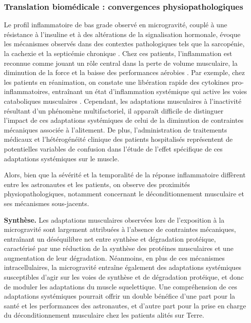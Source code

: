 \documentclass[11pt]{report}
\begin{document}
\subsubsection{Translation biomédicale : convergences physiopathologiques}

Le profil inflammatoire de bas grade observé en microgravité, couplé à une résistance à l'insuline et à des altérations de la signalisation hormonale, évoque les mécanismes observés dans des contextes pathologiques tels que la sarcopénie, la cachexie et la septicémie chronique \parencite{mehdi_endocrine_2025}. Chez ces patients, l'inflammation est reconnue comme jouant un rôle central dans la perte de volume musculaire, la diminution de la force et la baisse des performances aérobies \parencite{Damanti2024Oct}. Par exemple, chez les patients en réanimation, on constate une libération rapide des cytokines pro-inflammatoires, entraînant un état d'inflammation systémique qui active les voies cataboliques musculaires \parencite{mehdi_endocrine_2025,Damanti2024Oct}. Cependant, les adaptations musculaires à l'inactivité résultant d'un phénomène multifactoriel, il apparaît difficile de distinguer l'impact de ces adaptations systémiques de celui de la diminution de contraintes mécaniques associée à l'alitement. De plus, l'administration de traitements médicaux et l'hétérogénéité clinique des patients hospitalisés représentent de potentielles variables de confusion dans l'étude de l'effet spécifique de ces adaptations systémiques sur le muscle. 

Alors, bien que la sévérité et la temporalité de la réponse inflammatoire diffèrent entre les astronautes et les patients, on observe des proximités physiopathologiques, notamment concernant le déconditionnement musculaire et ses mécanismes sous-jacents.

\begin{tcolorbox}[colback=gray!3,colframe=gray!50, width=\textwidth]
	\textbf{Synthèse.} Les adaptations musculaires observées lors de l'exposition à la microgravité sont largement attribuées à l'absence de contraintes mécaniques, entraînant un déséquilibre net entre synthèse et dégradation protéique, caractérisé par une réduction de la synthèse des protéines musculaires et une augmentation de leur dégradation. Néanmoins, en plus de ces mécanismes intracellulaires, la microgravité entraîne également des adaptations systémiques susceptibles d'agir sur les voies de synthèse et de dégradation protéique, et donc de moduler les adaptations du muscle squelettique. Une compréhension de ces adaptations systémiques pourrait offrir un double bénéfice d'une part pour la santé et les performances des astronautes, et d'autre part pour la prise en charge du déconditionnement musculaire chez les patients alités sur Terre.
\end{tcolorbox}
\end{document}
